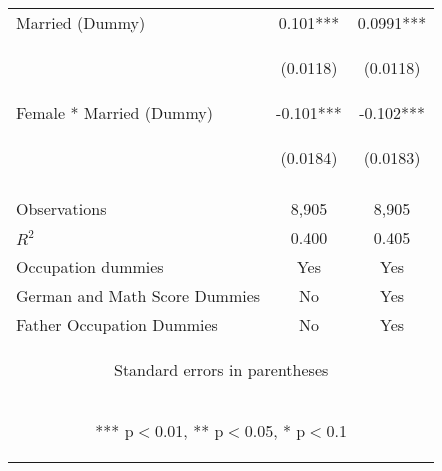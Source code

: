 \begin{center}
\begin{tabular}{lcc}
Married (Dummy) & 0.101*** & 0.0991*** \\
\vspace{4pt} & \begin{footnotesize}(0.0118)\end{footnotesize} & \begin{footnotesize}(0.0118)\end{footnotesize} \\
Female * Married (Dummy) & -0.101*** & -0.102*** \\
 & \begin{footnotesize}(0.0184)\end{footnotesize} & \begin{footnotesize}(0.0183)\end{footnotesize} \\
\vspace{4pt} & \begin{footnotesize}\end{footnotesize} & \begin{footnotesize}\end{footnotesize} \\
Observations & 8,905 & 8,905 \\
$R^2$ & 0.400 & 0.405 \\
Occupation dummies & Yes & Yes \\
German and Math Score Dummies & No & Yes \\
 Father Occupation Dummies & No & Yes \\ \hline
\multicolumn{3}{c}{\begin{footnotesize} Standard errors in parentheses\end{footnotesize}} \\
\multicolumn{3}{c}{\begin{footnotesize} *** p$<$0.01, ** p$<$0.05, * p$<$0.1\end{footnotesize}} \\
\end{tabular}
\end{center}
